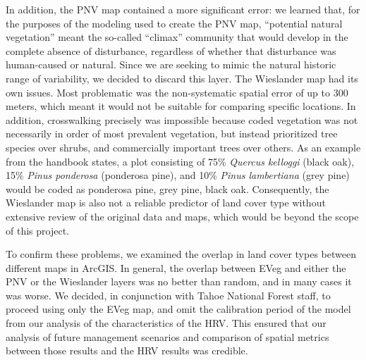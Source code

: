 In addition, the PNV map contained a more significant error: we learned that, for the purposes of the modeling used to create the PNV map, ``potential natural vegetation'' meant the so-called ``climax'' community that would develop in the complete absence of disturbance, regardless of whether that disturbance was human-caused or natural. Since we are seeking to mimic the natural historic range of variability, we decided to discard this layer. The Wieslander map had its own issues. Most problematic was the non-systematic spatial error of up to 300 meters, which meant it would not be suitable for comparing specific locations. In addition, crosswalking precisely was impossible because coded vegetation was not necessarily in order of most prevalent vegetation, but instead prioritized tree species over shrubs, and commercially important trees over others. As an example from the handbook states, a plot consisting of 75\% \emph{Quercus kelloggi} (black oak), 15\% \emph{Pinus ponderosa} (ponderosa pine), and 10\% \emph{Pinus lambertiana} (grey pine) would be coded as ponderosa pine, grey pine, black oak. Consequently, the Wieslander map is also not a reliable predictor of land cover type without extensive review of the original data and maps, which would be beyond the scope of this project. 

To confirm these problems, we examined the overlap in land cover types between different maps in ArcGIS. In general, the overlap between EVeg and either the PNV or the Wieslander layers was no better than random, and in many cases it was worse. We decided, in conjunction with Tahoe National Forest staff, to proceed using only the EVeg map, and omit the calibration period of the model from our analysis of the characteristics of the HRV. This ensured that our analysis of future management scenarios and comparison of spatial metrics between those results and the HRV results was credible.

